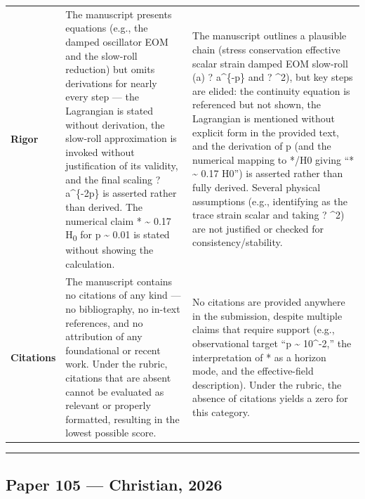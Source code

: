 \documentclass[11pt]{article}
\begin{document}
\begin{longtable}{@{} p{2.2cm} p{6.3cm} p{6.3cm} @{}}
\rowcolor{rowgray}
\textbf{Rigor} &
The manuscript presents equations (e.g., the damped oscillator EOM and the slow-roll reduction) but omits derivations for nearly every step --- the Lagrangian is stated without derivation, the slow-roll approximation is invoked without justification of its validity, and the final scaling \textrho{} ? a\textasciicircum{}\{-2p\} is asserted rather than derived. The numerical claim \textomega{}* \textasciitilde{} 0.17 H\textsubscript{0} for p \textasciitilde{} 0.01 is stated without showing the calculation. &
The manuscript outlines a plausible chain (stress conservation \textrightarrow{} effective scalar strain \textepsilon{} \textrightarrow{} damped EOM \textrightarrow{} slow-roll \textrightarrow{} \textepsilon{}(a) ? a\textasciicircum{}\{-p\} and \textrho{} ? \textepsilon{}\textasciicircum{}2), but key steps are elided: the continuity equation is referenced but not shown, the Lagrangian is mentioned without explicit form in the provided text, and the derivation of p (and the numerical mapping to \textomega{}*/H0 giving ``\textomega{}* \textasciitilde{} 0.17 H0'') is asserted rather than fully derived. Several physical assumptions (e.g., identifying \textepsilon{} as the trace strain scalar and taking \textrho{} ? \textepsilon{}\textasciicircum{}2) are not justified or checked for consistency/stability. \\[6pt]

\textbf{Citations} &
The manuscript contains no citations of any kind --- no bibliography, no in-text references, and no attribution of any foundational or recent work. Under the rubric, citations that are absent cannot be evaluated as relevant or properly formatted, resulting in the lowest possible score. &
No citations are provided anywhere in the submission, despite multiple claims that require support (e.g., observational target ``p \textasciitilde{} 10\textasciicircum{}-2,'' the interpretation of \textomega{}* as a horizon mode, and the effective-field description). Under the rubric, the absence of citations yields a zero for this category. \\

\end{longtable}

\bigskip
\hrule
\bigskip

\subsection*{Paper 105 --- Christian, 2026}
\end{document}
